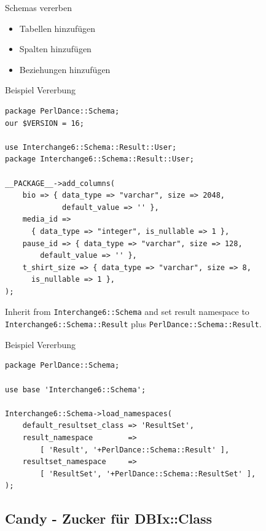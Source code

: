 \begin{frame}{Schemas vererben}
\begin{itemize}
\item Tabellen hinzufügen
\item Spalten hinzufügen
\item Beziehungen hinzufügen
\end{itemize}
\end{frame}

\begin{frame}[fragile]{Beispiel Vererbung}
\begin{lstlisting}
package PerlDance::Schema;
our $VERSION = 16;

use Interchange6::Schema::Result::User;
package Interchange6::Schema::Result::User;

__PACKAGE__->add_columns(
    bio => { data_type => "varchar", size => 2048, 
             default_value => '' },
    media_id =>
      { data_type => "integer", is_nullable => 1 },
    pause_id => { data_type => "varchar", size => 128, 
        default_value => '' },
    t_shirt_size => { data_type => "varchar", size => 8, 
      is_nullable => 1 },
);
\end{lstlisting}
\end{frame}

Inherit from \verb|Interchange6::Schema| and set result namespace to 
\verb|Interchange6::Schema::Result| plus \verb|PerlDance::Schema::Result|.

\begin{frame}[fragile]{Beispiel Vererbung}
\begin{lstlisting}
package PerlDance::Schema;

use base 'Interchange6::Schema';

Interchange6::Schema->load_namespaces(
    default_resultset_class => 'ResultSet',
    result_namespace        =>
        [ 'Result', '+PerlDance::Schema::Result' ],
    resultset_namespace     =>
        [ 'ResultSet', '+PerlDance::Schema::ResultSet' ],
);
\end{lstlisting}
\end{frame}


\subsection{Candy - Zucker für DBIx::Class}

